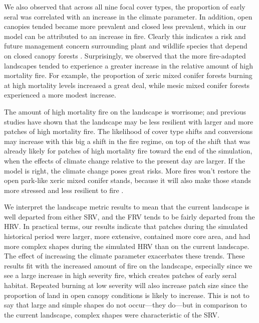 \documentclass[12pt]{article}
\begin{document}
\begin{spacing}{1}
We also observed that across all nine focal cover types, the proportion of early seral was correlated with an increase in the climate parameter. In addition, open canopies tended became more prevalent and closed less prevalent, which in our model can be attributed to an increase in fire. Clearly this indicates a risk and future management concern surrounding plant and wildlife species that depend on closed canopy forests \citep{McKenzie2004}. Surprisingly, we observed that the more fire-adapted landscapes tended to experience a greater increase in the relative amount of high mortality fire. For example, the proportion of xeric mixed conifer forests burning at high mortality levels increased a great deal, while mesic mixed conifer forests experienced a more modest increase.

The amount of high mortality fire on the landscape is worrisome; and previous studies have shown that the landscape may be less resilient with larger and more patches of high mortality fire. The likelihood of cover type shifts and conversions may increase with this big a shift in the fire regime, on top of the shift that was already likely for patches of high mortality fire toward the end of the simulation, when the effects of climate change relative to the present day are larger. If the model is right, the climate change poses great risks. More fires won't restore the open park-like xeric mixed conifer stands, because it will also make those stands more stressed and less resilient to fire \citep{Lydersen2014}.

We interpret the landscape metric results to mean that the current landscape is well departed from either SRV, and the FRV tends to be fairly departed from the HRV. In practical terms, our results indicate that patches during the simulated historical period were larger, more extensive, contained more core area, and had more complex shapes during the simulated HRV than on the current landscape. The effect of increasing the climate parameter exacerbates these trends. These results fit with the increased amount of fire on the landscape, especially since we see a large increase in high severity fire, which creates patches of early seral habitat. Repeated burning at low severity will also increase patch size since the proportion of land in open canopy conditions is likely to increase. This is not to say that large and simple shapes do not occur—they do—but in comparison to the current landscape, complex shapes were characteristic of the SRV.


\end{spacing}
\end{document}
